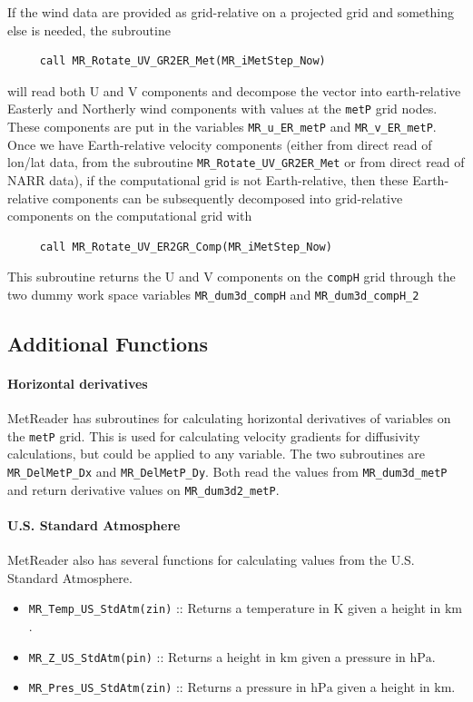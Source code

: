 \documentclass[11pt]{article}   %
\begin{document}
If the wind data are provided as grid-relative on a projected grid and something else
is needed, the subroutine
\begin{verbatim}
     call MR_Rotate_UV_GR2ER_Met(MR_iMetStep_Now)
\end{verbatim}
will read both U and V components and decompose the vector into earth-relative Easterly
and Northerly wind components with values at the \texttt{metP} grid nodes.  These
components are put in the variables \texttt{MR\_u\_ER\_metP} and \texttt{MR\_v\_ER\_metP}.
Once we have Earth-relative velocity components (either from direct read of lon/lat data,
from the subroutine \texttt{MR\_Rotate\_UV\_GR2ER\_Met} or from direct read of NARR data),
if the computational grid is not Earth-relative, then these Earth-relative components can be
subsequently decomposed into grid-relative components on the computational grid with
\begin{verbatim}
     call MR_Rotate_UV_ER2GR_Comp(MR_iMetStep_Now)
\end{verbatim}
This subroutine returns the U and V components on the \texttt{compH} grid through the two
dummy work space variables \texttt{MR\_dum3d\_compH} and \texttt{MR\_dum3d\_compH\_2}

\subsection{Additional Functions}
\paragraph{Horizontal derivatives}
MetReader has subroutines for calculating horizontal derivatives of variables on the
\texttt{metP} grid.  This is used for calculating velocity gradients for diffusivity
calculations, but could be applied to any variable.  The two subroutines are
\texttt{MR\_DelMetP\_Dx} and \texttt{MR\_DelMetP\_Dy}.  Both read the values from
\texttt{MR\_dum3d\_metP} and return derivative values on \texttt{MR\_dum3d2\_metP}.

\paragraph{U.S. Standard Atmosphere}
MetReader also has several functions for calculating values from the U.S. Standard
Atmosphere.
\begin{itemize}
\item  \texttt{MR\_Temp\_US\_StdAtm(zin)} :: Returns a temperature in $\mathrm{K}$
given a height in $\mathrm{km}$.
\item  \texttt{MR\_Z\_US\_StdAtm(pin)} :: Returns a height in $\mathrm{km}$ given a
pressure in $\mathrm{hPa}$.
\item  \texttt{MR\_Pres\_US\_StdAtm(zin)} :: Returns a pressure in $\mathrm{hPa}$ given
a height in $\mathrm{km}$.
\end{itemize}
\end{document}
